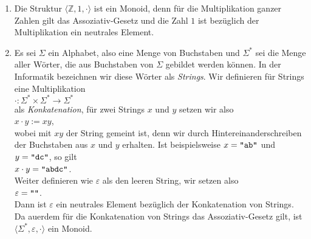 \examples
\begin{enumerate}
\item Die Struktur $\langle \mathbb{Z}, 1, \cdot \rangle$ ist ein Monoid, denn f\"{u}r die Multiplikation
      ganzer Zahlen gilt das Assoziativ-Gesetz und die Zahl $1$ ist bez\"{u}glich der Multiplikation ein
      neutrales Element.
\item Es sei $\Sigma$ ein Alphabet, also eine Menge von Buchstaben und $\Sigma^*$ sei die Menge aller
      W\"{o}rter, die aus Buchstaben von $\Sigma$ gebildet werden k\"{o}nnen.  In der Informatik bezeichnen
      wir diese W\"{o}rter als \emph{\color{blue}Strings}.  Wir definieren f\"{u}r Strings eine Multiplikation
      \\[0.2cm]
      \hspace*{1.3cm}
      $\cdot: \Sigma^* \times \Sigma^* \rightarrow \Sigma^*$
      \\[0.2cm]
      als \emph{\color{blue}Konkatenation}, f\"{u}r zwei Strings $x$ und $y$ setzen wir also
      \\[0.2cm]
      \hspace*{1.3cm}
      $x \cdot y := xy$,
      \\[0.2cm]
      wobei mit $xy$ der String gemeint ist, denn wir durch Hintereinanderschreiben der Buchstaben
      aus $x$ und $y$ erhalten.  Ist beispielsweise $x = \texttt{\symbol{34}ab\symbol{34}}$ und $y = \texttt{\symbol{34}dc\symbol{34}}$,
      so gilt 
      \\[0.2cm]
      \hspace*{1.3cm}
      $x \cdot y = \texttt{\symbol{34}abdc\symbol{34}}$.
      \\[0.2cm]
      Weiter definieren wie $\varepsilon$ als den leeren String, wir setzen also
      \\[0.2cm]
      \hspace*{1.3cm}
      $\varepsilon = \texttt{\symbol{34}\symbol{34}}$.
      \\[0.2cm]
      Dann ist $\varepsilon$ ein neutrales Element bez\"{u}glich der Konkatenation von Strings.  Da
      au\3erdem f\"{u}r die Konkatenation von Strings das Assoziativ-Gesetz gilt, ist $\langle \Sigma^*, \varepsilon, \cdot \rangle$ ein
      Monoid. 
      \eoxs
\end{enumerate}


